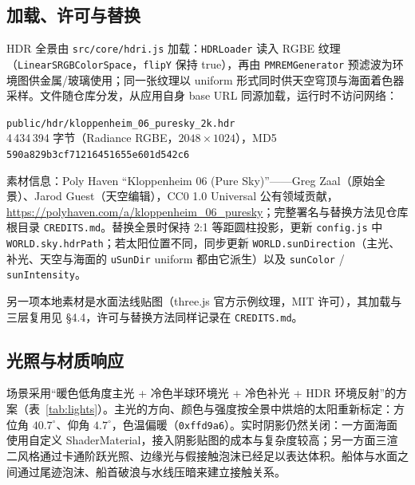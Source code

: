 \documentclass[UTF8, a4paper, 11pt]{ctexart}
\newcommand{\file}[1]{\texttt{#1}}
\begin{document}
\subsection{加载、许可与替换}

HDR 全景由 \file{src/core/hdri.js} 加载：\texttt{HDRLoader} 读入 RGBE 纹理（\texttt{LinearSRGBColorSpace}，\texttt{flipY} 保持 true），再由 \texttt{PMREMGenerator} 预滤波为环境图供金属/玻璃使用；同一张纹理以 uniform 形式同时供天空穹顶与海面着色器采样。文件随仓库分发，从应用自身 base URL 同源加载，运行时不访问网络：

\begin{center}\small
\file{public/hdr/kloppenheim\_06\_puresky\_2k.hdr}\\[0.25em]
4\,434\,394 字节（Radiance RGBE，$2048\times1024$），MD5 \texttt{590a829b3cf71216451655e601d542c6}
\end{center}

素材信息：Poly Haven “Kloppenheim 06 (Pure Sky)”——Greg Zaal（原始全景）、Jarod Guest（天空编辑），CC0 1.0 Universal 公有领域贡献，\url{https://polyhaven.com/a/kloppenheim_06_puresky}；完整署名与替换方法见仓库根目录 \file{CREDITS.md}。替换全景时保持 2:1 等距圆柱投影，更新 \file{config.js} 中 \texttt{WORLD.sky.hdrPath}；若太阳位置不同，同步更新 \texttt{WORLD.sunDirection}（主光、补光、天空与海面的 \texttt{uSunDir} uniform 都由它派生）以及 \texttt{sunColor} / \texttt{sunIntensity}。

另一项本地素材是水面法线贴图（three.js 官方示例纹理，MIT 许可），其加载与三层复用见 §4.4，许可与替换方法同样记录在 \file{CREDITS.md}。

\subsection{光照与材质响应}

场景采用“暖色低角度主光 + 冷色半球环境光 + 冷色补光 + HDR 环境反射”的方案（表~\ref{tab:lights}）。主光的方向、颜色与强度按全景中烘焙的太阳重新标定：方位角 $40.7^\circ$、仰角 $4.7^\circ$，色温偏暖（\texttt{0xffd9a6}）。实时阴影仍然关闭：一方面海面使用自定义 ShaderMaterial，接入阴影贴图的成本与复杂度较高；另一方面三渲二风格通过卡通阶跃光照、边缘光与假接触泡沫已经足以表达体积。船体与水面之间通过尾迹泡沫、船首破浪与水线压暗来建立接触关系。
\end{document}
